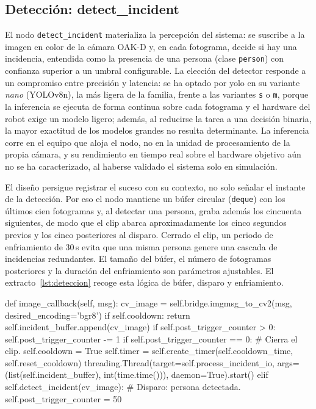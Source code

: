 \subsection{Detección: detect\_incident}
\label{sec:detect-incident}

El nodo \texttt{detect\_incident} materializa la percepción del sistema: se suscribe
a la imagen en color de la cámara OAK-D y, en cada fotograma, decide si hay una
incidencia, entendida como la presencia de una persona (clase \texttt{person}) con
confianza superior a un umbral configurable. La elección del detector responde a un
compromiso entre precisión y latencia: se ha optado por \gls{yolo} en su variante
\textit{nano} (YOLOv8n), la más ligera de la familia, frente a las variantes
\texttt{s} o \texttt{m}, porque la inferencia se ejecuta de forma continua sobre cada
fotograma y el hardware del robot exige un modelo ligero; además, al reducirse la
tarea a una decisión binaria, la mayor exactitud de los modelos grandes no resulta
determinante. La inferencia corre en el equipo que aloja el nodo, no en la unidad de
procesamiento de la propia cámara, y su rendimiento en tiempo real sobre el hardware
objetivo aún no se ha caracterizado, al haberse validado el sistema solo en
simulación.

El diseño persigue registrar el suceso con su contexto, no solo señalar el instante
de la detección. Por eso el nodo mantiene un búfer circular (\texttt{deque}) con los
últimos cien fotogramas y, al detectar una persona, graba además los cincuenta
siguientes, de modo que el clip abarca aproximadamente los cinco segundos previos y
los cinco posteriores al disparo. Cerrado el clip, un periodo de enfriamiento de
30\,s evita que una misma persona genere una cascada de incidencias redundantes. El
tamaño del búfer, el número de fotogramas posteriores y la duración del enfriamiento
son parámetros ajustables. El extracto~\ref{lst:deteccion} recoge esta lógica de
búfer, disparo y enfriamiento.

%
\begin{pythoncode}[title={Lógica de detección con búfer y enfriamiento (detect\_incident.py)}, label={lst:deteccion}]
def image_callback(self, msg):
    cv_image = self.bridge.imgmsg_to_cv2(msg, desired_encoding='bgr8')
    if self.cooldown:
        return
    self.incident_buffer.append(cv_image)
    if self.post_trigger_counter > 0:
        self.post_trigger_counter -= 1
        if self.post_trigger_counter == 0:       # Cierra el clip.
            self.cooldown = True
            self.timer = self.create_timer(self.cooldown_time, self.reset_cooldown)
            threading.Thread(target=self.process_incident_io,
                             args=(list(self.incident_buffer), int(time.time())),
                             daemon=True).start()
    elif self.detect_incident(cv_image):         # Disparo: persona detectada.
        self.post_trigger_counter = 50
\end{pythoncode}%


